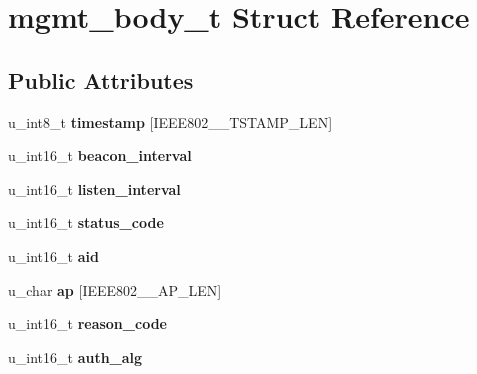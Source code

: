 \hypertarget{structmgmt__body__t}{
\section{mgmt\_\-body\_\-t Struct Reference}
\label{structmgmt__body__t}
}
\subsection*{Public Attributes}
\begin{DoxyCompactItemize}
\item 
\hypertarget{structmgmt__body__t_a56344dff12aa738f915051cd9dbdb522}{
u\_\-int8\_\-t {\bfseries timestamp} \mbox{[}IEEE802\_\_\-TSTAMP\_\-LEN\mbox{]}}
\label{structmgmt__body__t_a56344dff12aa738f915051cd9dbdb522}

\item 
\hypertarget{structmgmt__body__t_ad05644b3d4d3cb654158e8e82878a699}{
u\_\-int16\_\-t {\bfseries beacon\_\-interval}}
\label{structmgmt__body__t_ad05644b3d4d3cb654158e8e82878a699}

\item 
\hypertarget{structmgmt__body__t_a75aced6504773ba28e25c304886cebf8}{
u\_\-int16\_\-t {\bfseries listen\_\-interval}}
\label{structmgmt__body__t_a75aced6504773ba28e25c304886cebf8}

\item 
\hypertarget{structmgmt__body__t_a814091080f3956d212677313d1707776}{
u\_\-int16\_\-t {\bfseries status\_\-code}}
\label{structmgmt__body__t_a814091080f3956d212677313d1707776}

\item 
\hypertarget{structmgmt__body__t_ad708aea8cf81e4862fdb8f24fcdb092c}{
u\_\-int16\_\-t {\bfseries aid}}
\label{structmgmt__body__t_ad708aea8cf81e4862fdb8f24fcdb092c}

\item 
\hypertarget{structmgmt__body__t_af7b4287fa527ac7287cad5c79daca6f7}{
u\_\-char {\bfseries ap} \mbox{[}IEEE802\_\_\-AP\_\-LEN\mbox{]}}
\label{structmgmt__body__t_af7b4287fa527ac7287cad5c79daca6f7}

\item 
\hypertarget{structmgmt__body__t_af500d93e4796203bf371a90afe88d142}{
u\_\-int16\_\-t {\bfseries reason\_\-code}}
\label{structmgmt__body__t_af500d93e4796203bf371a90afe88d142}

\item 
\hypertarget{structmgmt__body__t_ad7985efa8dedb3137dc7a3cb9075babb}{
u\_\-int16\_\-t {\bfseries auth\_\-alg}}
\label{structmgmt__body__t_ad7985efa8dedb3137dc7a3cb9075babb}


\end{DoxyCompactItemize}
